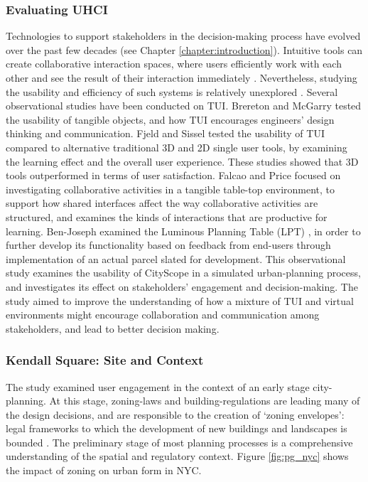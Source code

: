 {    \subsubsection{Evaluating UHCI}
    {
        Technologies to support stakeholders in the decision-making process have evolved over the past few decades (see Chapter \eqref{chapter:introduction}). Intuitive tools can create collaborative interaction spaces, where users efficiently work with each other and see the result of their interaction immediately \cite{ishii2002augmented}. Nevertheless, studying the usability and efficiency of such systems is relatively unexplored \cite{Innes2016}.
        \newline
        Several observational studies have been conducted on TUI. Brereton and McGarry \cite{brereton2000observational} tested the usability of tangible objects, and how TUI encourages engineers' design thinking and communication. Fjeld and Sissel \cite{fjeld2002alternative} tested the usability of TUI compared to alternative traditional 3D and 2D single user tools, by examining the learning effect and the overall user experience. These studies showed that 3D tools outperformed in terms of user satisfaction. Falcao and Price \cite{price2009effect} focused on investigating collaborative activities in a tangible table-top environment, to support how shared interfaces affect the way collaborative activities are structured, and examines the kinds of interactions that are productive for learning. Ben-Joseph examined the Luminous Planning Table (LPT) \cite{ben-joseph2001}, in order to further develop its functionality based on feedback from end-users through implementation of an actual parcel slated for development.
        \newline
        This observational study examines the usability of CityScope in a simulated urban-planning process, and investigates its effect on stakeholders' engagement and decision-making. The study aimed to improve the understanding of how a mixture of TUI and virtual environments might encourage collaboration and communication among stakeholders, and lead to better decision making.
    }

    \subsubsection{Kendall Square: Site and Context}
    {
        The study examined user engagement in the context of an early stage city-planning. At this stage, zoning-laws and building-regulations are leading many of the design decisions, and are responsible to the creation of `zoning envelopes': legal frameworks to which the development of new buildings and landscapes is bounded \cite{n15, Ben-Joseph2004}. The preliminary stage of most planning processes is a comprehensive understanding of the spatial and regulatory context. Figure \eqref{fig:pg_nyc} shows the impact of zoning on urban form in NYC.

}}
